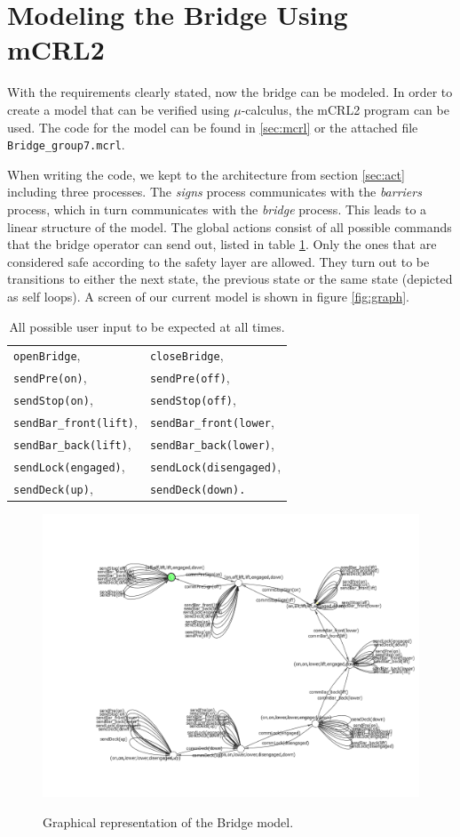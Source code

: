 \section{Modeling the Bridge Using mCRL2}

With the requirements clearly stated, now the bridge can be modeled. In order to create a model that can be verified using $\mu$-calculus, the mCRL2 program can be used. The code for the model can be found in \ref{sec:mcrl} or the attached file \texttt{Bridge\_group7.mcrl}.

When writing the code, we kept to the architecture from section \ref{sec:act} including three processes. The \emph{signs} process communicates with the \emph{barriers} process, which in turn communicates with the \emph{bridge} process. This leads to a linear structure of the model. The global actions consist of all possible commands that the bridge operator can send out, listed in table \ref{tab:allow}. Only the ones that are considered safe according to the safety layer are allowed. They turn out to be transitions to either the next state, the previous state or the same state (depicted as self loops). A screen of our current model is shown in figure \ref{fig:graph}.
%
\begin{table}[htb]%
\begin{tabular}{ll}
	\texttt{openBridge},& \texttt{closeBridge},\\
	\texttt{sendPre(on)},& \texttt{sendPre(off)},\\
	\texttt{sendStop(on)},& \texttt{sendStop(off)},\\
	\texttt{sendBar\_front(lift)},& \texttt{sendBar\_front(lower},\\
	\texttt{sendBar\_back(lift)},& \texttt{sendBar\_back(lower)},\\
	\texttt{sendLock(engaged)},& \texttt{sendLock(disengaged)},\\
	\texttt{sendDeck(up)},& \texttt{sendDeck(down).}\\
\end{tabular}
\caption{All possible user input to be expected at all times.}
\label{tab:allow}
\end{table}
%
\begin{figure}[htb]
\centering
\includegraphics[width=\columnwidth]{Images/Bridge_allow_ltsgraph.png}
\label{fig:graph}
\caption{Graphical representation of the Bridge model.}%
\label{}%
\end{figure}%
%

\newpage